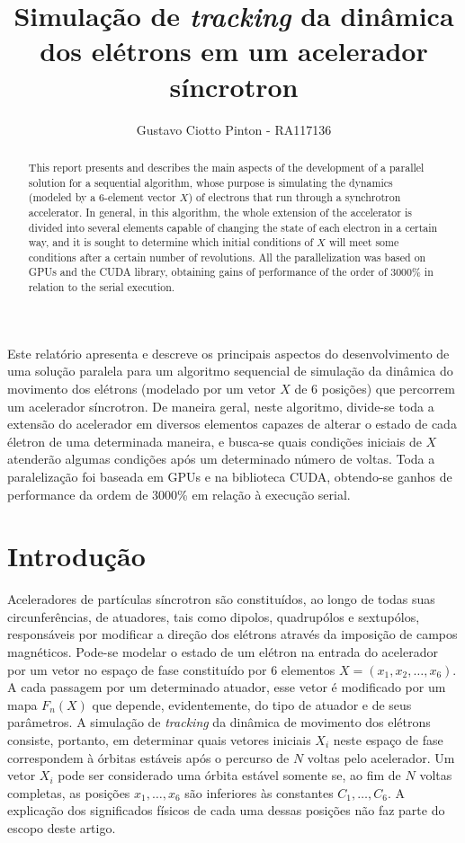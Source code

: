 \documentclass[12pt]{article}
\title{Simulação de \textit{tracking} da dinâmica dos elétrons em um acelerador
síncrotron}
\author{Gustavo Ciotto Pinton\inst{1} - RA117136 }
\begin{document}
 

\maketitle

\begin{abstract}
This report presents and describes the main aspects of the development of a
parallel solution for a sequential algorithm, whose purpose is simulating
the dynamics (modeled by a 6-element vector \(X\)) of electrons that
run through a synchrotron accelerator. In general, in this algorithm, the whole
extension of the accelerator is divided into several elements capable of
changing the state of each electron in a certain way, and it is sought to
determine which initial conditions of \(X\) will meet some conditions after a
certain number of revolutions. All the parallelization was based on GPUs and the
CUDA library, obtaining gains of performance of the order of 3000\% in relation
to the serial execution.
\end{abstract}
     
\begin{resumo} 
Este relatório apresenta e descreve os principais aspectos do
desenvolvimento de uma solução paralela para um algoritmo sequencial de
simulação da dinâmica do movimento dos elétrons (modelado por um vetor \(X\) de
6 posições) que percorrem um acelerador síncrotron. De maneira geral, neste
algoritmo, divide-se toda a extensão do acelerador em diversos elementos capazes de alterar o estado de cada életron de
uma determinada maneira, e busca-se quais condições iniciais de \(X\) atenderão
algumas condições após um determinado número de voltas. Toda a paralelização foi
baseada em GPUs e na biblioteca CUDA, obtendo-se ganhos de performance da ordem
de 3000\% em relação à execução serial.
\end{resumo}


\section{Introdução}

Aceleradores de partículas síncrotron são constituídos, ao longo de todas suas
circunferências, de atuadores, tais como dipolos, quadrupólos e sextupólos,
responsáveis por modificar a direção dos elétrons através da imposição de campos
magnéticos. Pode-se modelar o estado de um elétron na entrada do acelerador por
um vetor no espaço de fase constituído por 6 elementos \( X = (x_1, x_2, \ldots,
x_6) \). A cada passagem por um determinado atuador, esse vetor é modificado por
um mapa \(F_n(X)\) que depende, evidentemente, do tipo de atuador e de seus
parâmetros. A simulação de \textit{tracking} da dinâmica de movimento dos
elétrons consiste, portanto, em determinar quais vetores iniciais \(X_i\) neste
espaço de fase correspondem à órbitas estáveis após o percurso de \(N\) voltas
pelo acelerador. Um vetor \(X_i\) pode ser considerado uma
órbita estável somente se, ao fim de \(N\) voltas completas, as posições \(x_1,
\ldots, x_6 \) são inferiores às constantes \(C_1, \ldots, C_6\). A explicação
dos significados físicos de cada uma dessas posições não faz parte do escopo
deste artigo.
\end{document}
